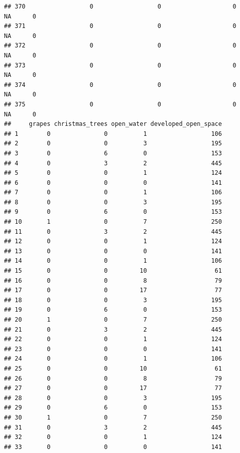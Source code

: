 \documentclass[
]{article}
\begin{document}
\begin{verbatim}
## 370                  0                  0                    0       NA      0
## 371                  0                  0                    0       NA      0
## 372                  0                  0                    0       NA      0
## 373                  0                  0                    0       NA      0
## 374                  0                  0                    0       NA      0
## 375                  0                  0                    0       NA      0
##     grapes christmas_trees open_water developed_open_space
## 1        0               0          1                  106
## 2        0               0          3                  195
## 3        0               6          0                  153
## 4        0               3          2                  445
## 5        0               0          1                  124
## 6        0               0          0                  141
## 7        0               0          1                  106
## 8        0               0          3                  195
## 9        0               6          0                  153
## 10       1               0          7                  250
## 11       0               3          2                  445
## 12       0               0          1                  124
## 13       0               0          0                  141
## 14       0               0          1                  106
## 15       0               0         10                   61
## 16       0               0          8                   79
## 17       0               0         17                   77
## 18       0               0          3                  195
## 19       0               6          0                  153
## 20       1               0          7                  250
## 21       0               3          2                  445
## 22       0               0          1                  124
## 23       0               0          0                  141
## 24       0               0          1                  106
## 25       0               0         10                   61
## 26       0               0          8                   79
## 27       0               0         17                   77
## 28       0               0          3                  195
## 29       0               6          0                  153
## 30       1               0          7                  250
## 31       0               3          2                  445
## 32       0               0          1                  124
## 33       0               0          0                  141

\end{verbatim}
\end{document}
